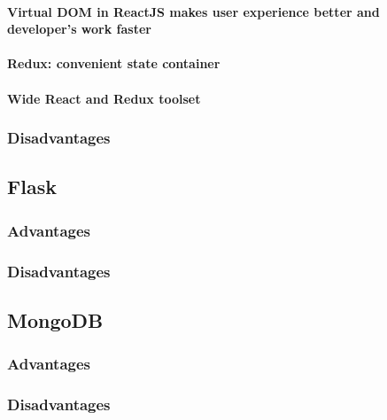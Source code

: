 \paragraph{Virtual DOM in ReactJS makes user experience better and developer’s work faster}

\paragraph{Redux: convenient state container}

\paragraph{Wide React and Redux toolset}

\subsubsection{Disadvantages}


\subsection{Flask}

\subsubsection{Advantages}

\subsubsection{Disadvantages}


\subsection{MongoDB}

\subsubsection{Advantages}

\subsubsection{Disadvantages}